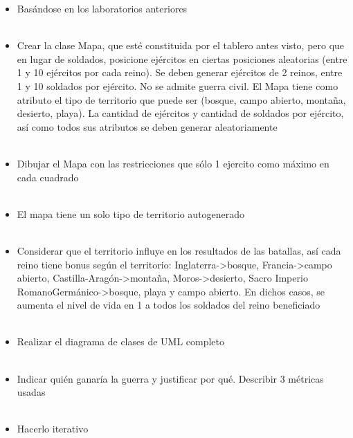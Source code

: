 \documentclass{article}
\begin{document}
\begin{itemize}
\begin{itemize}
    
	\end{itemize}
	\begin{itemize}
        \textcolor{red}{PROBLEMA 02}
        \\
        \\
        \item Basándose en los laboratorios anteriores
        \\
        \\
        \item Crear la clase Mapa, que esté constituida por el tablero antes visto, pero que en lugar de soldados, posicione ejércitos en ciertas posiciones aleatorias (entre 1 y 10 ejércitos por cada reino). Se deben generar ejércitos de 2 reinos, entre 1 y 10 soldados por ejército. No se admite guerra civil. El Mapa tiene como atributo el tipo de territorio que puede ser (bosque, campo abierto, montaña, desierto, playa). La cantidad de ejércitos y cantidad de soldados por ejército, así como todos sus atributos se deben generar aleatoriamente
        \\
        \\
        \item Dibujar el Mapa con las restricciones que sólo 1 ejercito como máximo en cada cuadrado
        \\
        \\
        \item El mapa tiene un solo tipo de territorio autogenerado
        \\
        \\
        \item Considerar que el territorio influye en los resultados de las batallas, así cada reino tiene bonus según el territorio: Inglaterra->bosque, Francia->campo abierto, Castilla-Aragón->montaña, Moros->desierto, Sacro Imperio RomanoGermánico->bosque, playa y campo abierto. En dichos casos, se aumenta el nivel de vida en 1 a todos los soldados del reino beneficiado
        \\
        \\
        \item Realizar el diagrama de clases de UML completo
        \\
        \\
        \item Indicar quién ganaría la guerra y justificar por qué. Describir 3 métricas usadas
        \\
        \\
        \item Hacerlo iterativo

\end{itemize}
\end{itemize}
\end{document}
